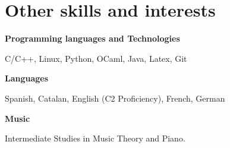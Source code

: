 \section{Other skills and interests}
\textbf{Programming languages and Technologies}

\setlength{\parindent}{2em}
C/C++, Linux, Python, OCaml, Java, Latex, Git

\setlength{\parindent}{0pt}
\textbf{Languages}

\setlength{\parindent}{2em}
Spanish, Catalan, English (C2 Proficiency), French, German

\setlength{\parindent}{0pt}
\textbf{Music}

\setlength{\parindent}{2em}
Intermediate Studies in Music Theory and Piano.

